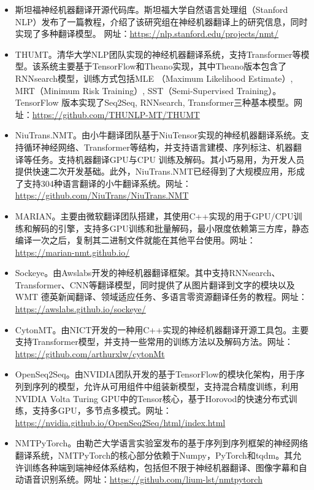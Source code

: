 \begin{appendices}
\begin{itemize}
\item 斯坦福神经机器翻译开源代码库。斯坦福大学自然语言处理组（Stanford NLP）发布了一篇教程，介绍了该研究组在神经机器翻译上的研究信息，同时实现了多种翻译模型。 网址：\url{https://nlp.stanford.edu/projects/nmt/}
\vspace{0.5em}
\item THUMT。清华大学NLP团队实现的神经机器翻译系统，支持Transformer等模型。该系统主要基于TensorFlow和Theano实现，其中Theano版本包含了RNNsearch模型，训练方式包括MLE （Maximum Likelihood Estimate）, MRT（Minimum Risk Training）, SST（Semi-Supervised Training）。TensorFlow 版本实现了Seq2Seq, RNNsearch, Transformer三种基本模型。网址：\url{https://github.com/THUNLP-MT/THUMT}
\vspace{0.5em}
\item NiuTrans.NMT。由小牛翻译团队基于NiuTensor实现的神经机器翻译系统。支持循环神经网络、Transformer等结构，并支持语言建模、序列标注、机器翻译等任务。支持机器翻译GPU与CPU 训练及解码。其小巧易用，为开发人员提供快速二次开发基础。此外，NiuTrans.NMT已经得到了大规模应用，形成了支持304种语言翻译的小牛翻译系统。网址：\url{https://github.com/NiuTrans/NiuTrans.NMT}
\vspace{0.5em}
\item MARIAN。主要由微软翻译团队搭建，其使用C++实现的用于GPU/CPU训练和解码的引擎，支持多GPU训练和批量解码，最小限度依赖第三方库，静态编译一次之后，复制其二进制文件就能在其他平台使用。网址：\url{https://marian-nmt.github.io/}
\vspace{0.5em}
\item Sockeye。由Awslabs开发的神经机器翻译框架。其中支持RNNsearch、Transformer、CNN等翻译模型，同时提供了从图片翻译到文字的模块以及WMT 德英新闻翻译、领域适应任务、多语言零资源翻译任务的教程。网址：\url{https://awslabs.github.io/sockeye/}
\vspace{0.5em}
\item CytonMT。由NICT开发的一种用C++实现的神经机器翻译开源工具包。主要支持Transformer模型，并支持一些常用的训练方法以及解码方法。网址：\url{https://github.com/arthurxlw/cytonMt}
\vspace{0.5em}
\item OpenSeq2Seq。由NVIDIA团队开发的基于TensorFlow的模块化架构，用于序列到序列的模型，允许从可用组件中组装新模型，支持混合精度训练，利用NVIDIA Volta Turing GPU中的Tensor核心，基于Horovod的快速分布式训练，支持多GPU，多节点多模式。网址：\url{https://nvidia.github.io/OpenSeq2Seq/html/index.html}
\vspace{0.5em}
\item NMTPyTorch。由勒芒大学语言实验室发布的基于序列到序列框架的神经网络翻译系统，NMTPyTorch的核心部分依赖于Numpy，PyTorch和tqdm。其允许训练各种端到端神经体系结构，包括但不限于神经机器翻译、图像字幕和自动语音识别系统。网址：\url{https://github.com/lium-lst/nmtpytorch}
\vspace{0.5em}
\end{itemize}

\end{appendices}
